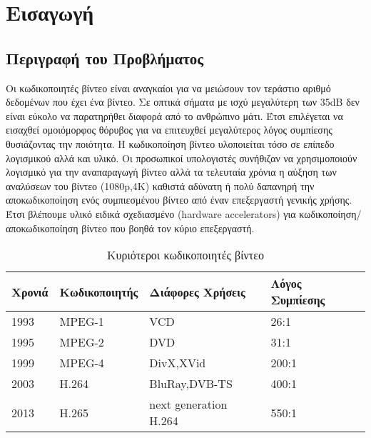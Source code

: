﻿\chapter{Εισαγωγή}
\label{chapter:chap1}

\section{Περιγραφή του Προβλήματος}
\label{section:sect11}
\indent
Οι κωδικοποιητές βίντεο είναι αναγκαίοι για να μειώσουν τον τεράστιο αριθμό δεδομένων που έχει ένα βίντεο. Σε οπτικά σήματα με ισχύ μεγαλύτερη των \si{35}{dB} δεν είναι εύκολο να παρατηρήθει διαφορά από το ανθρώπινο μάτι. Έτσι επιλέγεται να εισαχθεί ομοιόμορφος θόρυβος για να επιτευχθεί μεγαλύτερος λόγος συμπίεσης θυσιάζοντας την ποιότητα.
Η κωδικοποίηση βίντεο υλοποιείται τόσο σε επίπεδο λογισμικού αλλά και υλικό. Οι προσωπικοί υπολογιστές συνήθιζαν να χρησιμοποιούν λογισμικό για την αναπαραγωγή βίντεο αλλά τα τελευταία χρόνια η αύξηση των αναλύσεων του βίντεο (1080p,4K) καθιστά αδύνατη ή πολύ δαπανηρή την αποκωδικοποίηση ενός συμπιεσμένου βίντεο από έναν επεξεργαστή γενικής χρήσης. Έτσι βλέπουμε υλικό ειδικά σχεδιασμένο (hardware accelerators) για κωδικοποίηση/αποκωδικοποίηση βίντεο που βοηθά τον κύριο επεξεργαστή.

\begin{table}[h!]
    \begin{center}
        \begin{tabular}{| l | l | l | l |}
        \hline
        Χρονιά  & Κωδικοποιητής & Διάφορες Χρήσεις      & Λόγος Συμπίεσης           \\ \hline
        1993    & MPEG-1        &       VCD             &       26:1                \\ \hline
        1995    & MPEG-2        &       DVD             &       31:1                \\ \hline
        1999    & MPEG-4        &    DivX,XVid          &      200:1                \\ \hline
        2003    & H.264         & BluRay,DVB-TS         &      400:1                \\ \hline
        2013    & H.265         & next generation H.264 &      550:1                \\ \hline
        \hline
        \end{tabular}
    \end{center}

    \caption{Κυριότεροι κωδικοποιητές βίντεο}
    \label{table:listofcodecs}
\end{table}

